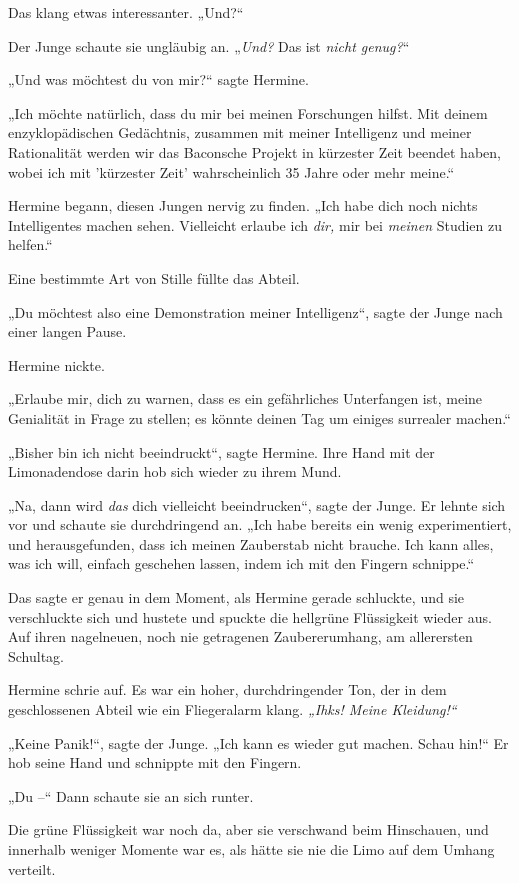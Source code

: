 {Das klang etwas interessanter. „Und?“

Der Junge schaute sie ungläubig an. „\emph{Und?} Das ist \emph{nicht genug?}“

„Und was möchtest du von mir?“ sagte Hermine.

„Ich möchte natürlich, dass du mir bei meinen Forschungen hilfst. Mit deinem enzyklopädischen Gedächtnis, zusammen mit meiner Intelligenz und meiner Rationalität werden wir das Baconsche Projekt in kürzester Zeit beendet haben, wobei ich mit 'kürzester Zeit' wahrscheinlich 35 Jahre oder mehr meine.“

Hermine begann, diesen Jungen nervig zu finden. „Ich habe dich noch nichts Intelligentes machen sehen. Vielleicht erlaube ich \emph{dir,} mir bei \emph{meinen} Studien zu helfen.“

Eine bestimmte Art von Stille füllte das Abteil.

„Du möchtest also eine Demonstration meiner Intelligenz“, sagte der Junge nach einer langen Pause.

Hermine nickte.

„Erlaube mir, dich zu warnen, dass es ein gefährliches Unterfangen ist, meine Genialität in Frage zu stellen; es könnte deinen Tag um einiges surrealer machen.“

„Bisher bin ich nicht beeindruckt“, sagte Hermine. Ihre Hand mit der Limonadendose darin hob sich wieder zu ihrem Mund.

„Na, dann wird \emph{das} dich vielleicht beeindrucken“, sagte der Junge. Er lehnte sich vor und schaute sie durchdringend an. „Ich habe bereits ein wenig experimentiert, und herausgefunden, dass ich meinen Zauberstab nicht brauche. Ich kann alles, was ich will, einfach geschehen lassen, indem ich mit den Fingern schnippe.“

Das sagte er genau in dem Moment, als Hermine gerade schluckte, und sie verschluckte sich und hustete und spuckte die hellgrüne Flüssigkeit wieder aus. Auf ihren nagelneuen, noch nie getragenen Zaubererumhang, am allerersten Schultag.

Hermine schrie auf. Es war ein hoher, durchdringender Ton, der in dem geschlossenen Abteil wie ein Fliegeralarm klang. \emph{„Ihks! Meine Kleidung!“}

„Keine Panik!“, sagte der Junge. „Ich kann es wieder gut machen. Schau hin!“ Er hob seine Hand und schnippte mit den Fingern.

„Du --“ Dann schaute sie an sich runter.

Die grüne Flüssigkeit war noch da, aber sie verschwand beim Hinschauen, und innerhalb weniger Momente war es, als hätte sie nie die Limo auf dem Umhang verteilt.

}
